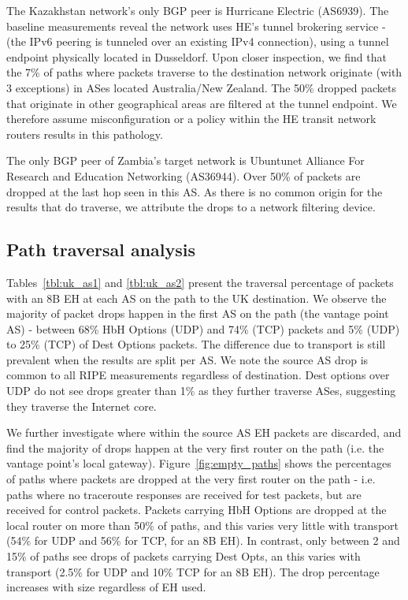 \documentclass[conference]{IEEEtran}
\begin{document}
The Kazakhstan network's only BGP peer is Hurricane Electric (AS6939). The baseline measurements reveal the network uses HE's tunnel brokering service - (the IPv6 peering is tunneled over an existing IPv4 connection), using a tunnel endpoint physically located in Dusseldorf. Upon closer inspection, we find that the 7\% of paths where packets traverse to the destination network originate (with 3 exceptions) in ASes located Australia/New Zealand. The 50\% dropped packets that originate in other geographical areas are filtered at the tunnel endpoint. We therefore assume misconfiguration or a policy within the HE transit network routers results in this pathology. 


The only BGP peer of Zambia's target network is Ubuntunet Alliance For Research and Education Networking (AS36944). Over 50\% of packets are dropped at the last hop seen in this AS. As there is no common origin for the results that do traverse, we attribute the drops to a network filtering device. 

\subsection{Path traversal analysis}

Tables~\ref{tbl:uk_as1} and \ref{tbl:uk_as2} present the traversal percentage of packets with an 8B EH at each AS on the path to the UK destination. We observe the majority of packet drops happen in the first AS on the path (the vantage point AS) - between 68\% HbH Options (UDP) and 74\% (TCP) packets and 5\% (UDP) to 25\% (TCP) of Dest Options packets. The difference due to transport is still prevalent when the results are split per AS. 
We note the source AS drop is common to all RIPE measurements regardless of destination. Dest options over UDP do not see drops greater than 1\% as they further traverse ASes, suggesting they traverse the Internet core.

We further investigate where within the source AS EH packets are discarded, and find the majority of drops happen at the very first router on the path (i.e. the vantage point's local gateway).
Figure~\ref{fig:empty_paths} shows the percentages of paths where packets are dropped at the very first router on the path - i.e. paths where no traceroute responses are received for test packets, but are received for control packets. Packets carrying HbH Options are dropped at the local router on more than 50\% of paths, and this varies very little with transport (54\% for UDP and 56\% for TCP, for an 8B EH). In contrast, only between 2 and 15\% of paths see drops of packets carrying Dest Opts, an this varies with transport (2.5\% for UDP and 10\% TCP for an 8B EH). The drop percentage increases with size regardless of EH used.
\end{document}
